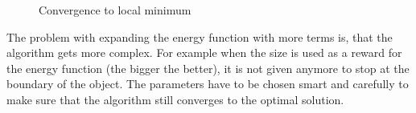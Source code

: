 \begin{figure}[h]
\begin{tabular}{cc}
    \end{tabular}
    \caption{Convergence to local minimum}
    \label{fig:ac_ellipse_gradient}
    \end{figure}

The problem with expanding the energy function with more terms is, that the algorithm gets more complex. For example when the size is used as a reward for the energy function (the bigger the better), it is not given anymore to stop at the boundary of the object. The parameters have to be chosen smart and carefully to make sure that the algorithm still converges to the optimal solution. 

